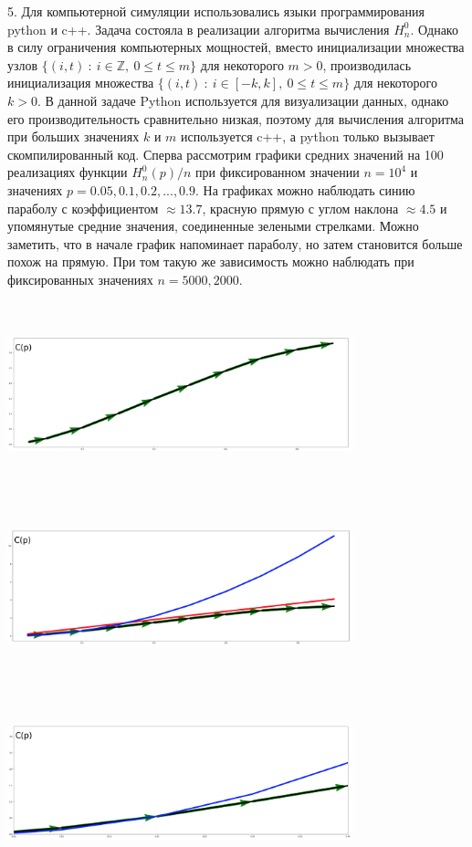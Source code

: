 \documentclass[10pt, reqno]{amsart}
\begin{document}
  5. Для компьютерной симуляции использовались языки программирования python и c++. Задача состояла в реализации алгоритма вычисления $H_{n}^{0}$. Однако в силу ограничения компьютерных мощностей, вместо инициализации множества узлов $\{(i, t) \: : \: i \in \mathbb{Z}, \: 0 \leq t \leq m\}$ для некоторого $m > 0$, производилась инициализация множества $\{(i, t) \: : \: i \in [-k, k], \: 0 \leq t \leq m\}$ для некоторого $k > 0$. В данной задаче Python используется для визуализации данных, однако его производительность сравнительно низкая, поэтому для вычисления алгоритма при больших значениях $k$ и $m$ используется c++, а python только вызывает скомпилированный код. Сперва рассмотрим графики средних значений на 100 реализациях функции $H_{n}^{0}(p)/n$ при фиксированном значении $n=10^{4}$ и значениях $p=0.05, 0.1, 0.2,..., 0.9$. На графиках можно наблюдать синию параболу с коэффициентом $\approx 13.7$, красную прямую с углом наклона $\approx 4.5$ и упомянутые средние значения, соединенные зелеными стрелками. Можно заметить, что в начале график напоминает параболу, но затем становится больше похож на прямую. При том такую же зависимость можно наблюдать при фиксированных значениях $n=5000, 2000$. \\\\
  \includegraphics[width=10cm, height=5cm]{c(p).png}
  \\\\
  \includegraphics[width=10cm, height=5cm]{c(p)_lin_sq.png}
  \\\\
  \includegraphics[width=10cm, height=5cm]{c(p)_sq_zoom.png}
\end{document}
